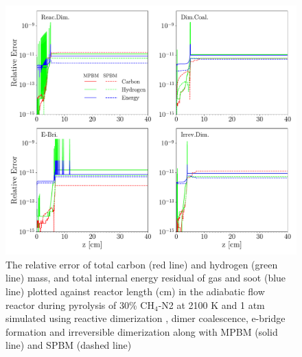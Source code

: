 \begin{figure}[!htbp]
	\centering
	\includegraphics[width=1\textwidth]{Figures/Results/Validation/PFR/relerr_pfr.pdf}
	\caption{The relative error of total carbon (red line) and hydrogen (green line) mass, and total internal energy residual of gas and soot (blue line) plotted against reactor length (cm) in the adiabatic flow reactor during pyrolysis of 30\% $\mathrm{CH_4}$-N2 at 2100 K and 1 atm simulated using reactive dimerization , dimer coalescence, e-bridge formation and irreversible dimerization along with MPBM (solid line) and SPBM (dashed line)}
	\label{fig:pfrvalid}
\end{figure}